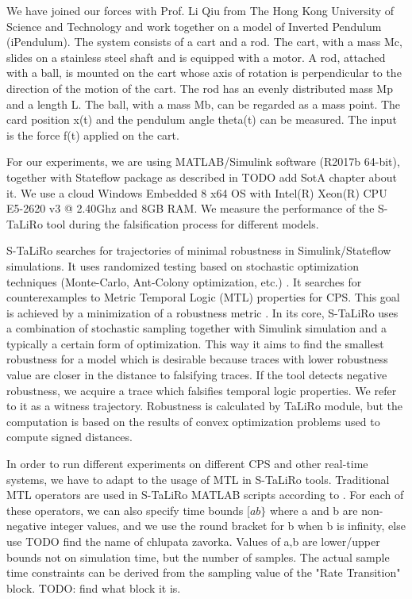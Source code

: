 We have joined our forces with Prof. Li Qiu from The Hong Kong University of Science and Technology and work together on a model of Inverted Pendulum (iPendulum). The system consists of a cart and a rod. The cart, with a mass Mc, slides on a stainless steel shaft and is equipped with a motor. A rod, attached with a ball, is mounted on the cart whose axis of rotation is perpendicular to the direction of the motion of the cart. The rod has an evenly distributed mass Mp and a length L. The ball, with a mass Mb, can be regarded as a mass point. The card position x(t) and the pendulum angle theta(t) can be measured. The input is the force f(t) applied on the cart.

For our experiments, we are using MATLAB/Simulink software (R2017b 64-bit), together with Stateflow package as described in {TODO add SotA chapter about it}. We use a cloud Windows Embedded 8 x64 OS with Intel(R) Xeon(R) CPU E5-2620 v3 @ 2.40Ghz and 8GB RAM. We measure the performance of the S-TaLiRo tool during the falsification process for different models.

S-TaLiRo searches for trajectories of minimal robustness in Simulink/Stateflow simulations. It uses randomized testing based on stochastic optimization techniques (Monte-Carlo, Ant-Colony optimization, etc.) \cite{Fainekos:AntColonies}. It searches for counterexamples to Metric Temporal Logic (MTL) properties for CPS. This goal is achieved by a minimization of a robustness metric \cite{Fainekos:RobustnessContinuousTime}. In its core, S-TaLiRo uses a combination of stochastic sampling together with Simulink simulation and a typically a certain form of optimization. This way it aims to find the smallest robustness for a model which is desirable because traces with lower robustness value are closer in the distance to falsifying traces. If the tool detects negative robustness, we acquire a trace which falsifies temporal logic properties. We refer to it as a witness trajectory. Robustness is calculated by TaLiRo module, but the computation is based on the results of convex optimization problems used to compute signed distances.

In order to run different experiments on different CPS and other real-time systems, we have to adapt to the usage of MTL in S-TaLiRo tools. Traditional MTL operators are used in S-TaLiRo MATLAB scripts according to . For each of these operators, we can also specify time bounds $[a b\}$ where a and b are non-negative integer values, and we use the round bracket for b when b is infinity, else use TODO find the name of chlupata zavorka. Values of a,b are lower/upper bounds not on simulation time, but the number of samples. The actual sample time constraints can be derived from the sampling value of the "Rate Transition" block. TODO: find what block it is.

